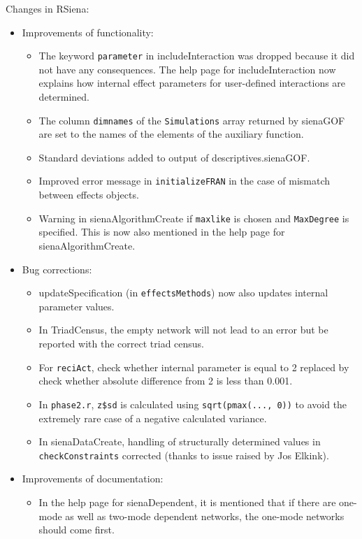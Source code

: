 \documentclass[a4paper,fleqn,11pt]{article}
\newcommand{\+}{\, + \,}
\newcommand{\sfn}[1]{\textsf{#1}}
\begin{document}
\begin{small}
\begin{itemize}
Changes in RSiena:
\begin{itemize}
\item Improvements of functionality:
   \begin{itemize}
  \item The keyword \texttt{parameter} in \sfn{includeInteraction} was dropped
    because it did not have any consequences.
    The help page for \sfn{includeInteraction} now
    explains how internal effect parameters for user-defined interactions
    are determined.
  \item The column \texttt{dimnames} of the \texttt{Simulations}
    array returned by \sfn{sienaGOF}
    are set to the names of the elements of the auxiliary function.
  \item Standard deviations added to output of \sfn{descriptives.sienaGOF}.
  \item Improved error message in \texttt{initializeFRAN} in the case of mismatch between
    effects objects.
  \item Warning in \sfn{sienaAlgorithmCreate} if \texttt{maxlike} is chosen and
    \texttt{MaxDegree} is specified.
    This is now also mentioned in the help page for \sfn{sienaAlgorithmCreate}.
    \end{itemize}
\item Bug corrections:
   \begin{itemize}
  \item \sfn{updateSpecification} (in \texttt{effectsMethods}) now also updates
    internal parameter values.
  \item In \sfn{TriadCensus}, the empty network will not lead to an error
    but be reported with the correct triad census.
  \item For \texttt{reciAct}, check whether internal parameter is equal to 2
    replaced by check whether
    absolute difference from 2 is less than 0.001.
  \item In \texttt{phase2.r}, \texttt{z\$sd} is calculated using
  \texttt{sqrt(pmax(..., 0))} to avoid the
    extremely rare case of a negative calculated variance.
  \item In \sfn{sienaDataCreate}, handling of structurally determined values
    in \texttt{checkConstraints} corrected (thanks to issue raised by Jos Elkink).
    \end{itemize}
\item Improvements of documentation:
   \begin{itemize}
  \item In the help page for \sfn{sienaDependent}, it is mentioned that if there are
    one-mode as well as two-mode dependent networks,
    the one-mode networks should come first.
    \end{itemize}
\end{itemize}


\end{itemize}
\end{small}
\end{document}
